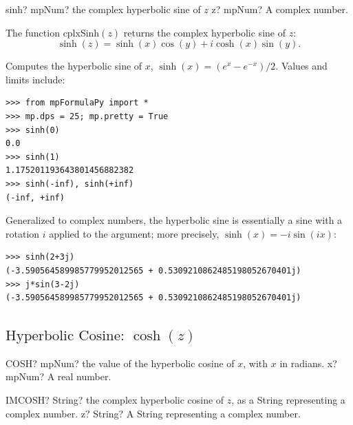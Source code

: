 \begin{mpFunctionsExtract}
	\mpFunctionOne
	{sinh? mpNum? the complex hyperbolic sine of $z$}
	{z? mpNum? A complex number.}
\end{mpFunctionsExtract}

\vspace{0.3cm}
The function \textsf{cplxSinh$(z)$} returns the complex hyperbolic sine of $z$: 
\begin{equation}
	\sinh(z) = \sinh(x) \cos(y) + i \cosh(x) \sin(y).
\end{equation}

Computes the hyperbolic sine of $x$, $\sinh(x) = (e^x-e^{-x})/2$. Values and limits include:

\begin{lstlisting}
>>> from mpFormulaPy import *
>>> mp.dps = 25; mp.pretty = True
>>> sinh(0)
0.0
>>> sinh(1)
1.175201193643801456882382
>>> sinh(-inf), sinh(+inf)
(-inf, +inf)
\end{lstlisting}

Generalized to complex numbers, the hyperbolic sine is essentially a sine with a rotation $i$ applied to the argument; more precisely, $\sinh(x) = -i \sin(ix)$: 

\begin{lstlisting}
>>> sinh(2+3j)
(-3.590564589985779952012565 + 0.5309210862485198052670401j)
>>> j*sin(3-2j)
(-3.590564589985779952012565 + 0.5309210862485198052670401j)
\end{lstlisting}




\newpage
\subsection{\texorpdfstring{$\text{Hyperbolic Cosine: }\cosh(z)$}{cosh}}

\begin{mpFunctionsExtract}
	\mpWorksheetFunctionOneNotImplemented
	{COSH? mpNum? the value of the hyperbolic cosine of $x$, with $x$ in radians.}
	{x? mpNum? A real number.}
\end{mpFunctionsExtract}

\vspace{0.6cm}
\begin{mpFunctionsExtract}
	\mpWorksheetFunctionOneNotImplemented
	{IMCOSH? String? the complex hyperbolic cosine of $z$, as a String representing a complex number.}
	{z? String? A String representing a complex number.}
\end{mpFunctionsExtract}



